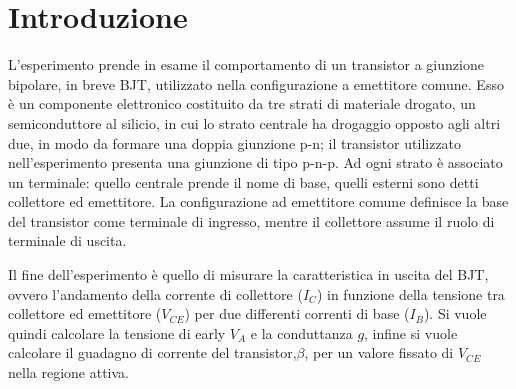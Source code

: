 \documentclass[../main.tex]{subfiles}
\begin{document}
    \section{Introduzione} \label{sec:introduzione}


    L'esperimento prende in esame il comportamento di un transistor a giunzione bipolare,
    in breve BJT, utilizzato nella configurazione a emettitore comune. Esso è un componente
    elettronico costituito da tre strati di materiale drogato,
    un semiconduttore al silicio, in cui lo strato centrale ha drogaggio opposto agli
    altri due, in modo da formare una doppia giunzione p-n; il transistor
    utilizzato nell'esperimento presenta una giunzione di tipo p-n-p. Ad ogni strato è associato
    un terminale: quello centrale prende il nome di base,
    quelli esterni sono detti collettore ed emettitore. La configurazione ad emettitore
    comune definisce la base del transistor come terminale di ingresso, mentre il
    collettore assume il ruolo di terminale di uscita. \newline

    Il fine dell'esperimento è quello di misurare la caratteristica in uscita del BJT,
    ovvero l'andamento della corrente di collettore ($I_C$) in funzione della tensione
    tra collettore ed emettitore ($V_{CE}$) per due differenti correnti di base ($I_B$). Si vuole
    quindi calcolare la tensione di early $V_A$ e la conduttanza $g$, infine si
    vuole calcolare il guadagno di corrente del transistor,$\beta$, per un valore fissato di $V_{CE}$
    nella regione attiva.


%
\end{document}
